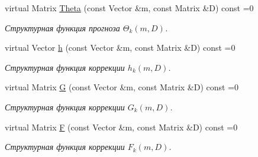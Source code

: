 \begin{DoxyCompactItemize}
virtual Matrix \hyperlink{class_core_1_1_discrete_task_a18906155257c5febd937f2f0c633e5ed}{Theta} (const Vector \&m, const Matrix \&D) const =0
\begin{DoxyCompactList}\small\item\em Структурная функция прогноза $\Theta_k(m, D)$. \end{DoxyCompactList}\item 
virtual Vector \hyperlink{class_core_1_1_discrete_task_a09eb964bfe445c1905758bfff4fc1537}{h} (const Vector \&m, const Matrix \&D) const =0
\begin{DoxyCompactList}\small\item\em Структурная функция коррекции $h_k(m, D)$. \end{DoxyCompactList}\item 
virtual Matrix \hyperlink{class_core_1_1_discrete_task_a5fd0bac544a6e124ad071043a37881c3}{G} (const Vector \&m, const Matrix \&D) const =0
\begin{DoxyCompactList}\small\item\em Структурная функция коррекции $G_k(m, D)$. \end{DoxyCompactList}\item 
virtual Matrix \hyperlink{class_core_1_1_discrete_task_ac55ca2cd47f0c9f7e5d3d3704becee46}{F} (const Vector \&m, const Matrix \&D) const =0
\begin{DoxyCompactList}\small\item\em Структурная функция коррекции $F_k(m, D)$. \end{DoxyCompactList}\end{DoxyCompactItemize}
